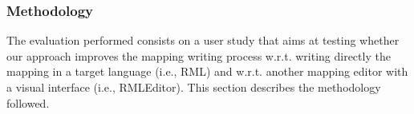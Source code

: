 
\subsubsection{Methodology}
\label{sec:chp5_mapeathor_eval_method}

The evaluation performed consists on a user study that aims at
testing whether our approach improves the mapping writing process w.r.t. writing directly the mapping in a target language (i.e., RML) and w.r.t. another mapping editor with a visual interface (i.e., RMLEditor). This section describes the methodology followed.

